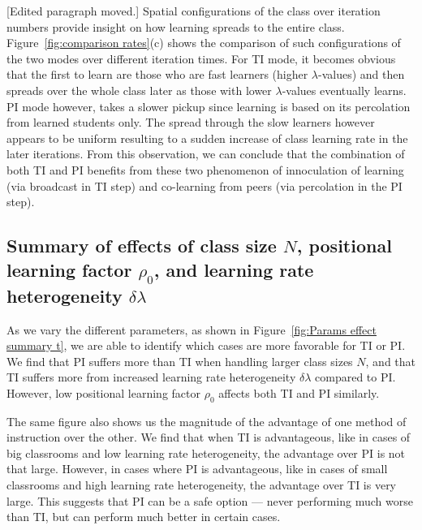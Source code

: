 \documentclass[twocolumn,secnumarabic,amssymb, nobibnotes, aps, prd]{revtex4-2}
\begin{document}
    {\color{red} [Edited paragraph moved.]}
    Spatial configurations of the class over iteration numbers provide insight on how learning spreads to the entire class.
    Figure~\ref{fig:comparison rates}(c) shows the comparison of such configurations of the two modes over different iteration times.
    For TI mode, it becomes obvious that the first to learn are those who are fast learners (higher $\lambda$-values) and then spreads over the whole class later as those with lower $\lambda$-values eventually learns.
    PI mode however, takes a slower pickup since learning is based on its percolation from learned students only.
    The spread through the slow learners however appears to be uniform resulting to a sudden increase of class learning rate in the later iterations.
    From this observation, we can conclude that the combination of both TI and PI benefits from these two phenomenon of innoculation of learning (via broadcast in TI step) and co-learning from peers (via percolation in the PI step).
    

    \subsection{Summary of effects of class size $N$, positional learning factor $\rho_0$, and learning rate heterogeneity $\delta\lambda$}
        
        As we vary the different parameters, as shown in Figure~\ref{fig:Params effect summary t}, we are able to identify which cases are more favorable for TI or PI.
        We find that PI suffers more than TI when handling larger class sizes $N$, and that TI suffers more from increased learning rate heterogeneity $\delta\lambda$ compared to PI.
        However, low positional learning factor $\rho_0$ affects both TI and PI similarly.

        The same figure also shows us the magnitude of the advantage of one method of instruction over the other.
        We find that when TI is advantageous, like in cases of big classrooms and low learning rate heterogeneity, the advantage over PI is not that large.
        However, in cases where PI is advantageous, like in cases of small classrooms and high learning rate heterogeneity, the advantage over TI is very large.
        This suggests that PI can be a safe option --- never performing much worse than TI, but can perform much better in certain cases.
\end{document}
